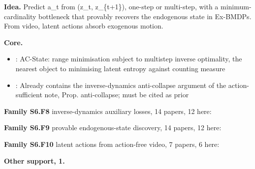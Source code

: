 \documentclass[10pt]{article}
\newcommand{\memb}[1]{\par\smallskip\textbf{#1}\quad}
\begin{document}
\textbf{Idea.} Predict a\_t from (z\_t, z\_\{t+1\}), one-step or multi-step, with a minimum-cardinality bottleneck that provably recovers the endogenous state in Ex-BMDPs. From video, latent actions absorb exogenous motion.

\memb{Core.}
\begin{itemize}[nosep,leftmargin=1.2em]
\item \citet{Lamb-guaranteed23}: AC-State: range minimisation subject to multistep inverse optimality, the nearest object to minimising latent entropy against counting measure
\item \citet{Ivashkov-smwm26}: Already contains the inverse-dynamics anti-collapse argument of the action-sufficient note, Prop. anti-collapse; must be cited as prior
\end{itemize}
\memb{Family S6.F8} inverse-dynamics auxiliary losses, 14 papers, 12 here: {\footnotesize \citetext{\citealp{Ivashkov-smwm26}; \citealp{Pathak-curiosity17}; \citealp{Allen-learning21}; \citealp{Boylan-gaussian26}; \citealp{Agrawal-learning16}; \citealp{Shelhamer-loss16}; \citealp{Choi-contingencyaware18}; \citealp{Kim-emi18}; \citealp{Paster-planning20}; \citealp{Brandfonbrener-inverse23}; \citealp{Rudolph-learning24}; \citealp{Han-enhancing26}}}

\memb{Family S6.F9} provable endogenous-state discovery, 14 papers, 12 here: {\footnotesize \citetext{\citealp{Lamb-guaranteed23}; \citealp{Efroni-provable22}; \citealp{Levine-multistep24}; \citealp{Misra-towards24}; \citealp{Du-provably19}; \citealp{Misra-kinematic19}; \citealp{Islam-agentcontroller22}; \citealp{Koul-pclast23}; \citealp{Mhammedi-representation23}; \citealp{Levine-learning24}; \citealp{Wu-generalizing24}; \citealp{Levine-offline25}}}

\memb{Family S6.F10} latent actions from action-free video, 7 papers, 6 here: {\footnotesize \citetext{\citealp{Nikulin-latent25}; \citealp{Baker-video22}; \citealp{Schmidt-learning23}; \citealp{Cui-dynamo24}; \citealp{Wang-ad324}; \citealp{Lee-latent26}}}

\memb{Other support, 1.} \citetext{\citealp{Hutter-uniqueness22}}
\end{document}
